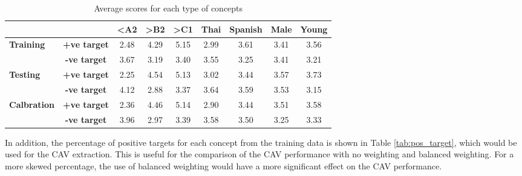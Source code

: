 \begin{table}[H]
    \centering
    \begin{tabular}{|lc|c|c|c|c|c|c|c|}
        \hline
        \multicolumn{2}{|l|}{\textbf{}}                            & \textbf{\textless{}A2} & \textbf{\textgreater{}B2} & \textbf{\textgreater{}C1} & \textbf{Thai} & \textbf{Spanish} & \textbf{Male} & \textbf{Young}        \\ \hline
        \multicolumn{1}{|l|}{\multirow{2}{*}{\textbf{Training}}}   & \textbf{+ve target}    & 2.48                      & 4.29                      & 5.15          & 2.99             & 3.61          & 3.41           & 3.56 \\ \cline{2-9}
        \multicolumn{1}{|l|}{}                                     & \textbf{-ve target}    & 3.67                      & 3.19                      & 3.40          & 3.55             & 3.25          & 3.41           & 3.21 \\ \hline
        \multicolumn{1}{|l|}{\multirow{2}{*}{\textbf{Testing}}}    & \textbf{+ve target}    & 2.25                      & 4.54                      & 5.13          & 3.02             & 3.44          & 3.57           & 3.73 \\ \cline{2-9}
        \multicolumn{1}{|l|}{}                                     & \textbf{-ve target}    & 4.12                      & 2.88                      & 3.37          & 3.64             & 3.59          & 3.53           & 3.15 \\ \hline
        \multicolumn{1}{|l|}{\multirow{2}{*}{\textbf{Calbration}}} & \textbf{+ve target}    & 2.36                      & 4.46                      & 5.14          & 2.90             & 3.44          & 3.51           & 3.58 \\ \cline{2-9}
        \multicolumn{1}{|l|}{}                                     & \textbf{-ve target}    & 3.96                      & 2.97                      & 3.39          & 3.58             & 3.50          & 3.25           & 3.33 \\ \hline
    \end{tabular}
    \caption{Average scores for each type of concepts}
    \label{tab:avg_scores}
\end{table}

In addition, the percentage of positive targets for each concept from the training data is shown in Table \ref{tab:pos_target}, which would be used for the CAV extraction. This is useful for the comparison of the CAV performance with no weighting and balanced weighting. For a more skewed percentage, the use of balanced weighting would have a more significant effect on the CAV performance.

